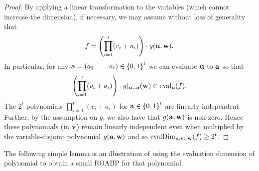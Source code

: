 \documentclass[11pt]{article}
\begin{document}
\begin{proof}
By applying a linear transformation to the variables (which cannot increase the dimension), if necessary, we may assume without loss of generality that
\[
f = \left( \prod_{i=1}^t (v_i + u_i) \right) \cdot g(\mathbf{u},\mathbf{w}).
\]
In particular, for any $\mathbf{a}=(a_1, \ldots, a_t) \in \left\{ 0,1 \right\}^t$ we can evaluate $\mathbf{u}$ to $\mathbf{a}$ so that
\[
 \left( \prod_{i=1}^t (v_i + a_i) \right) \cdot g|_{\mathbf{u}=\mathbf{a}}(\mathbf{w}) \in \operatorname{eval}_{\mathbf{u}}(f).
\]
The $2^t$ polynomials $\prod_{i=1}^t (v_i + a_i)$ for $\mathbf{a} \in \left\{ 0,1 \right\}^t$ are linearly independent. Further, by the assumption on $g$, we also have that $g(\mathbf{a},\mathbf{w})$ is non-zero. Hence these polynomials (in $\mathbf{v}$) remain linearly independent even when multiplied by the variable-disjoint polynomial $g(\mathbf{a}, \mathbf{w})$ and so $\operatorname{evalDim}_{\mathbf{u}, \mathbf{v} \sqcup \mathbf{w}} (f) \ge 2^{t}$.
\end{proof}



The following simple lemma is an illustration of using the evaluation dimension of polynomial to obtain a small ROABP for that polynomial. 
\end{document}
